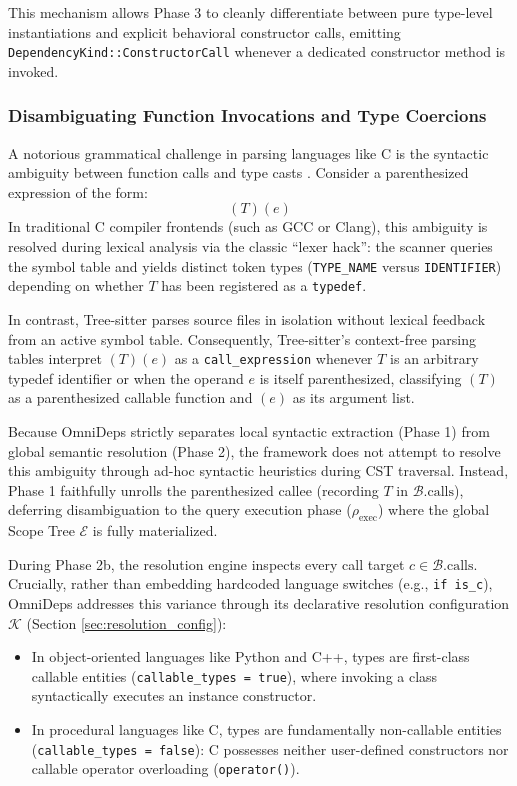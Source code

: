 This mechanism allows Phase 3 to cleanly differentiate between pure type-level
instantiations and explicit behavioral constructor calls, emitting
\texttt{Depend}\-\texttt{ency}\-\texttt{Kind::}\-\texttt{ConstructorCall}
whenever a dedicated
constructor method is
invoked.

\subsubsection{Disambiguating Function Invocations and Type Coercions}
\label{sec:call_cast_disambiguation}

A notorious grammatical challenge in parsing languages like C is the
syntactic ambiguity between function calls and type casts
\cite{aho_compilers_2007}.
Consider a parenthesized expression of the form:
\begin{equation}
  (T)(e)
\end{equation}
In traditional C compiler frontends (such as GCC or Clang), this ambiguity is
resolved during lexical analysis via the classic ``lexer hack'': the scanner
queries the symbol table and yields distinct token types (\texttt{TYPE\_NAME}
versus \texttt{IDENTIFIER}) depending on whether $T$ has been registered as a
\texttt{typedef}.

In contrast, Tree-sitter parses source files in isolation without lexical
feedback from an active symbol table. Consequently, Tree-sitter's context-free
parsing tables interpret $(T)(e)$ as a \texttt{call\_expression} whenever $T$ is
an arbitrary typedef identifier or when the operand $e$ is itself parenthesized,
classifying $(T)$ as a parenthesized callable function and $(e)$ as
its argument list.

Because OmniDeps strictly separates local syntactic extraction (Phase 1) from
global semantic resolution (Phase 2), the framework does not attempt to resolve
this ambiguity through ad-hoc syntactic heuristics during CST
traversal. Instead,
Phase 1 faithfully unrolls the parenthesized callee (recording $T$ in
$\mathcal{B}.\text{calls}$), deferring disambiguation to the query execution
phase ($\rho_{\text{exec}}$) where the global Scope Tree $\mathcal{E}$ is fully
materialized.

During Phase 2b, the resolution engine inspects every call target $c
\in \mathcal{B}.\text{calls}$.
Crucially, rather than embedding hardcoded language switches (e.g.,
\texttt{if is\_c}),
OmniDeps addresses this variance through its declarative resolution
configuration
$\mathcal{K}$ (Section \ref{sec:resolution_config}):
\begin{itemize}
  \item In object-oriented languages like Python and C++, types are first-class
    callable entities (\texttt{callable\_types = true}), where invoking a class
    syntactically executes an instance constructor.
  \item In procedural languages like C, types are fundamentally non-callable
    entities (\texttt{callable\_types = false}): C possesses neither
    user-defined
    constructors nor callable operator overloading (\texttt{operator()}).
\end{itemize}

